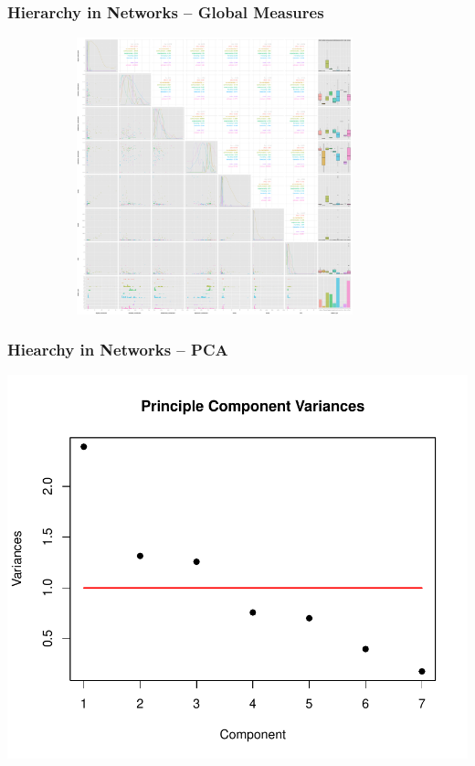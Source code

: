 \documentclass[xcolor={table}]{beamer}
\newenvironment{changemargin}[2]{%
  \begin{list}{}{%
    \setlength{\topsep}{0pt}%
    \setlength{\leftmargin}{#1}%
    \setlength{\rightmargin}{#2}%
    \setlength{\listparindent}{\parindent}%
    \setlength{\itemindent}{\parindent}%
    \setlength{\parsep}{\parskip}%
  }%
  \item[]}{\end{list}}
\begin{document}
\begin{frame}\frametitle{Hierarchy in Networks -- Global Measures}
\begin{changemargin}{-2cm}{ -2cm}
	\centering
	\includegraphics[width=12cm, height=8cm]{images/Fancy_Pairs_Plot.pdf}
\end{changemargin}
\end{frame}

\begin{frame}\frametitle{Hiearchy in Networks -- PCA}
\begin{changemargin}{-2cm}{ -2cm}
		\centering
		\includegraphics[scale = 0.6]{images/Observed_PCA_Component_Varinces.pdf}
\end{changemargin}
\end{frame}
\end{document}
